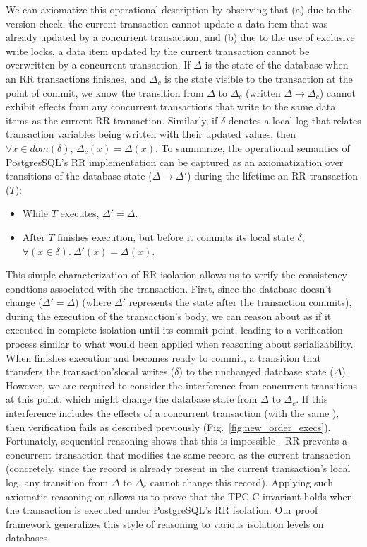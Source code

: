 We can axiomatize this operational description by observing that (a)
due to the version check, the current transaction cannot update a data
item that was already updated by a concurrent transaction, and (b) due
to the use of exclusive write locks, a data item updated by the
current transaction cannot be overwritten by a concurrent transaction.
If $\Delta$ is the state of the database when an RR transactions
finishes, and $\Delta_c$ is the state visible to the transaction at
the point of commit, we know the transition from $\Delta$ to
$\Delta_c$ (written $\Delta \longrightarrow \Delta_c$) cannot exhibit
effects from any concurrent transactions that write to the same data
items as the current RR transaction.  Similarly, if $\delta$ denotes
a local log that relates transaction variables being written with their updated values,
then $\forall x\in\mathit{dom}(\delta)$, $\Delta_c(x) =
\Delta(x)$. To summarize, the operational semantics of PostgresSQL's RR
implementation can be captured as an axiomatization over transitions of
the database state ($\Delta \longrightarrow \Delta'$) during the
lifetime an RR transaction ($T$):
\begin{itemize}
  \item While $T$ executes, $\Delta' = \Delta$.
  \item After $T$ finishes execution, but before it commits its local
    state $\delta$, $\forall(x\in\delta).~\Delta'(x) = \Delta(x)$.
\end{itemize}

This simple characterization of RR isolation allows us to verify the
consistency condtions associated with the 
transaction. First, since the database doesn't change ($\Delta' =
\Delta$) (where $\Delta'$ represents the state after the transaction
commits), during the execution of the transaction's body, we can
reason about  as if it executed in complete isolation
until its commit point, leading to a verification process similar to
what would been applied when reasoning about serializability.  When
 finishes execution and becomes ready to commit, a
transition that transfers the transaction'slocal writes ($\delta$) to
the unchanged database state ($\Delta$).  However, we are required to
consider the interference from concurrent transitions at this point,
which might change the database state from $\Delta$ to $\Delta_c$. If
this interference includes the effects of a concurrent 
transaction (with the same ), then verification fails as
described previously (Fig.~\ref{fig:new_order_execs}). Fortunately,
sequential reasoning shows that this is impossible - RR prevents a
concurrent  transaction that modifies the same
 record as the current transaction (concretely, since the
record is already present in the current transaction's local log, any
transition from $\Delta$ to $\Delta_c$ cannot change this record).
Applying such axiomatic reasoning on  allows us to prove
that the TPC-C invariant holds when the transaction is executed under
PostgreSQL's RR isolation.  Our proof framework generalizes this style
of reasoning to various isolation levels on databases.








